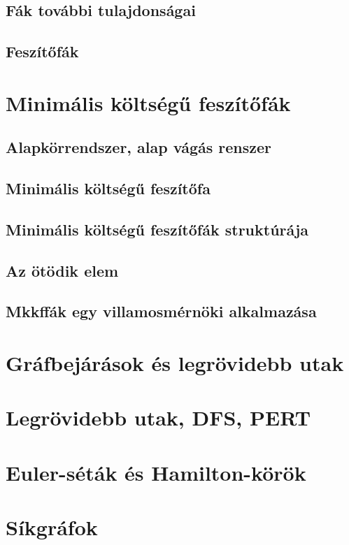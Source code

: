 \documentclass[12pt]{article}
\begin{document}
		\subsection{Fák további tulajdonságai}
		\subsection{Feszítőfák}
		
		
	\section{Minimális költségű feszítőfák}
		\subsection{Alapkörrendszer, alap vágás renszer}
		\subsection{Minimális költségű feszítőfa}
		\subsection{Minimális költségű feszítőfák struktúrája}
		\subsection{Az ötödik elem}
		\subsection{Mkkffák egy villamosmérnöki alkalmazása}
		
	\section{Gráfbejárások és legrövidebb utak}
		
	\section{Legrövidebb utak, DFS, PERT}
		
	\section{Euler-séták és Hamilton-körök}
	
	\section{Síkgráfok}
	
\end{document}
